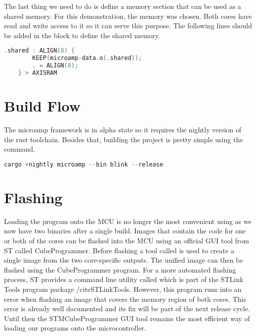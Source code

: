 The last thing we need to do is define a memory section that can be used as a shared memory. For this demonstration, the  memory was chosen. Both cores have read and write access to it so it can serve this purpose. The following lines should be added in the  block to define the shared memory.

\begin{lstlisting}[language=C,frame=single,float=!ht,label={lst:link-shared},caption={Defining Shared Memory in Linker File}]
    .shared : ALIGN(8) {
        KEEP(microamp-data.o(.shared));
        . = ALIGN(8);
    } > AXISRAM
\end{lstlisting}

\section{Build Flow}

The microamp framework is in alpha state so it requires the nightly version of the rust toolchain. Besides that, building the project is pretty simple using the  command.

\begin{lstlisting}[language=C,frame=single,float=!ht,label={lst:cargo-microamp},caption={Building a Dual Core Application with Microamp}]
    cargo +nightly microamp --bin blink --release
\end{lstlisting}

\section{Flashing}

Loading the program onto the MCU is no longer the most convenient using  as we now have two binaries after a single build. Images that contain the code for one or both of the cores can be flashed into the MCU using an official GUI tool from ST called CubeProgrammer. Before flashing a tool called  is used to create a single image from the two core-specific outputs. The unified image can then be flashed using the CubeProgrammer program. For a more automated flashing process, ST provides a command line utility called  which is part of the STLink Tools program package /cite{STLinkTools}. However, this program runs into an error when flashing an image that covers the memory region of both cores. This error \cite{STFlashError} is already well documented and its fix will be part of the next release cycle. Until then the STMCubeProgrammer GUI tool remains the most efficient way of loading our programs onto the microcontroller.
